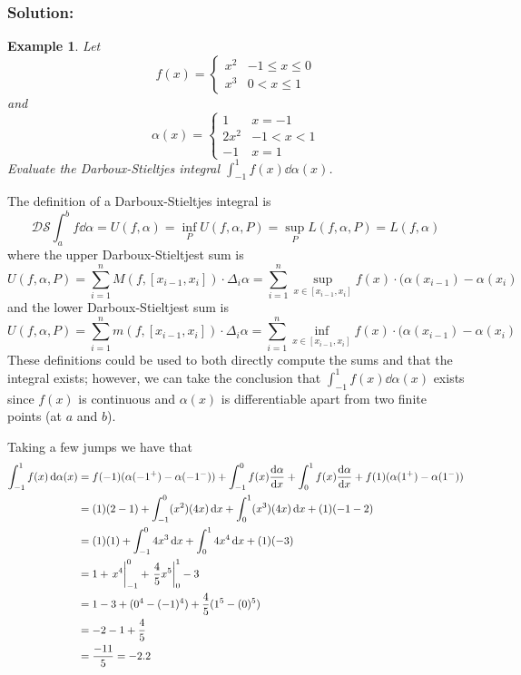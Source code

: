 \documentclass[]{article}
\newtheorem{example}{Example}
\begin{document}
\subsubsection*{Solution:}
\begin{example}
    Let \[
        f(x) = \begin{cases}
            x^2 & -1 \leq x \leq 0\\
            x^3 &  0 < x \leq 1
        \end{cases}
    \] and \[
        \alpha(x) = \begin{cases}
            1   & x = -1\\
            2 x^2   & -1 < x < 1\\
            -1  & x = 1
        \end{cases}
    \] Evaluate the Darboux-Stieltjes integral $\int_{-1}^{1} f(x) \dd{\alpha(x)}$.
\end{example}
The definition of a Darboux-Stieltjes integral is \[
    \mathcal{DS} \int_{a}^{b} f \dd{\alpha} 
    = U(f, \alpha) = \inf_{P} U(f, \alpha, P)
    = \sup_{P} L(f, \alpha, P) = L(f, \alpha)
\] where the upper Darboux-Stieltjest sum is \[
    U(f, \alpha, P) 
    = \sum_{i=1}^{n} M(f, [x_{i-1}, x_i]) \cdot \Delta_i \alpha
    = \sum_{i=1}^{n} \sup_{x \in [x_{i-1}, x_i]} f(x) \cdot (\alpha(x_{i-1}) - \alpha(x_{i})
\] and the lower Darboux-Stieltjest sum is \[
    U(f, \alpha, P) 
    = \sum_{i=1}^{n} m(f, [x_{i-1}, x_i]) \cdot \Delta_i \alpha
    = \sum_{i=1}^{n} \inf_{x \in [x_{i-1}, x_i]} f(x) \cdot (\alpha(x_{i-1}) - \alpha(x_{i})
\] These definitions could be used to both directly compute the sums and that the integral exists; however, we can take the conclusion that $\int_{-1}^{1} f(x) \dd{\alpha(x)}$ exists since $f(x)$ is continuous and $\alpha(x)$ is differentiable apart from two finite points (at $a$ and $b$).

Taking a few jumps we have that \begin{align*}
    \int_{-1}^{1} f(x) \dd{\alpha(x)}
        &= f(-1) (\alpha(-1^+) - \alpha(-1^-))
            + \int_{-1}^{0} f(x) \dv{\alpha}{x}
            + \int_{0}^{1} f(x) \dv{\alpha}{x}
            + f(1) (\alpha(1^+) - \alpha(1^-))\\
        &= (1) (2 - 1)
            + \int_{-1}^{0} (x^2) (4 x) \dd{x}
            + \int_{0}^{1} (x^3) (4 x) \dd{x}
            + (1) (-1 - 2)\\
        &= (1) (1)
            + \int_{-1}^{0} 4 x^3 \dd{x}
            + \int_{0}^{1} 4 x^4 \dd{x}
            + (1) (-3)\\
        &= 1
            + \eval{x^4}_{-1}^{0}
            + \eval{\frac{4}{5} x^5}_{0}^{1}
            -3\\
        &= 1 - 3 
            + (0^4 - (-1)^4)
            + \frac{4}{5} (1^5 - (0)^5)\\
        &= -2 - 1 + \frac{4}{5}\\
        &= \frac{-11}{5} = -2.2
\end{align*}
\end{document}
